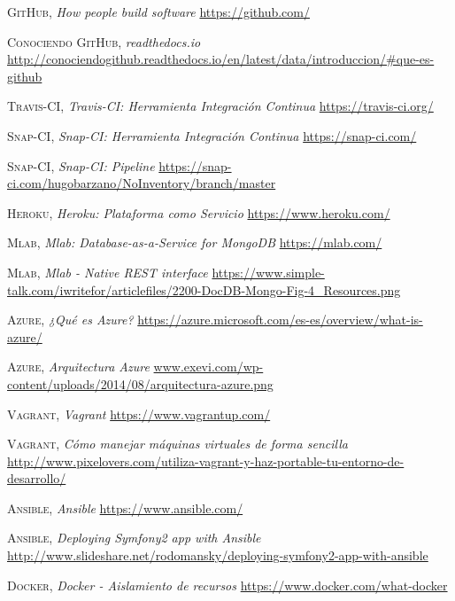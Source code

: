 \documentclass[a4paper,11pt]{book}
\begin{document}
\begin{thebibliography}{aaaa}
 \textsc{GitHub},
\textit{How people build software}
\url{https://github.com/}

 \textsc{Conociendo GitHub},
\textit{readthedocs.io }
\url{http://conociendogithub.readthedocs.io/en/latest/data/introduccion/#que-es-github}






 \textsc{Travis-CI},
\textit{Travis-CI: Herramienta Integración Continua}
\url{https://travis-ci.org/}




 \textsc{Snap-CI},
\textit{Snap-CI: Herramienta Integración Continua}
\url{https://snap-ci.com/}

 \textsc{Snap-CI},
\textit{Snap-CI: Pipeline}
\url{https://snap-ci.com/hugobarzano/NoInventory/branch/master}


 \textsc{Heroku},
\textit{Heroku: Plataforma como Servicio}
\url{https://www.heroku.com/}


 \textsc{Mlab},
\textit{Mlab: Database-as-a-Service for MongoDB}
\url{https://mlab.com/}

 \textsc{Mlab},
\textit{Mlab - Native REST interface}
\url{https://www.simple-talk.com/iwritefor/articlefiles/2200-DocDB-Mongo-Fig-4_Resources.png}



 \textsc{Azure},
\textit{¿Qué es Azure?}
\url{https://azure.microsoft.com/es-es/overview/what-is-azure/} 

 \textsc{Azure},
\textit{Arquitectura Azure}
\url{www.exevi.com/wp-content/uploads/2014/08/arquitectura-azure.png} 



 \textsc{Vagrant},
\textit{Vagrant}
\url{https://www.vagrantup.com/} 

 \textsc{Vagrant},
\textit{Cómo manejar máquinas virtuales de forma sencilla}
\url{http://www.pixelovers.com/utiliza-vagrant-y-haz-portable-tu-entorno-de-desarrollo/} 


 \textsc{Ansible},
\textit{Ansible}
\url{https://www.ansible.com/} 

 \textsc{Ansible},
\textit{Deploying Symfony2 app with Ansible}
\url{http://www.slideshare.net/rodomansky/deploying-symfony2-app-with-ansible} 


 \textsc{Docker},
\textit{Docker - Aislamiento de recursos}
\url{https://www.docker.com/what-docker} 


\end{thebibliography}
\end{document}
